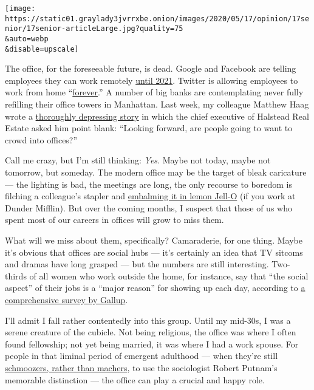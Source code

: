 \texttt{[image: https://static01.graylady3jvrrxbe.onion/images/2020/05/17/opinion/17senior/17senior-articleLarge.jpg?quality=75\\\&auto=webp\\\&disable=upscale]}

The office, for the foreseeable future, is dead. Google and Facebook are
telling employees they can work remotely
\href{https://www.nytimes3xbfgragh.onion/2020/05/08/technology/coronavirus-work-from-home.html}{until
2021}. Twitter is allowing employees to work from home
``\href{https://www.forbes.com/sites/johnbbrandon/2020/05/12/this-is-huge-twitter-ceo-says-employees-can-work-from-home-forever/}{forever}.''
A number of big banks are contemplating never fully refilling their
office towers in Manhattan. Last week, my colleague Matthew Haag wrote a
\href{https://www.nytimes3xbfgragh.onion/2020/05/12/nyregion/coronavirus-work-from-home.html}{thoroughly
depressing story} in which the chief executive of Halstead Real Estate
asked him point blank: ``Looking forward, are people going to want to
crowd into offices?''

Call me crazy, but I'm still thinking: \emph{Yes}. Maybe not today,
maybe not tomorrow, but someday. The modern office may be the target of
bleak caricature --- the lighting is bad, the meetings are long, the
only recourse to boredom is filching a colleague's stapler and
\href{https://www.youtube.com/watch?v=glFrp-CmNVA}{embalming it in lemon
Jell-O} (if you work at Dunder Mifflin). But over the coming months, I
suspect that those of us who spent most of our careers in offices will
grow to miss them.

What will we miss about them, specifically? Camaraderie, for one thing.
Maybe it's obvious that offices are social hubs --- it's certainly an
idea that TV sitcoms and dramas have long grasped --- but the numbers
are still interesting. Two-thirds of all women who work outside the
home, for instance, say that ``the social aspect'' of their jobs is a
``major reason'' for showing up each day, according to
\href{https://www.uvu.edu/uwlp/docs/gallupworkandlifewelllived-oct.pdf}{a
comprehensive survey by Gallup}.

I'll admit I fall rather contentedly into this group. Until my mid-30s,
I was a serene creature of the cubicle. Not being religious, the office
was where I often found fellowship; not yet being married, it was where
I had a work spouse. For people in that liminal period of emergent
adulthood --- when they're still
\href{http://metta-spencer.blogspot.com/2006/01/old-schmoozers-and-machers.html}{schmoozers,
rather than machers}, to use the sociologist Robert Putnam's memorable
distinction --- the office can play a crucial and happy role.

